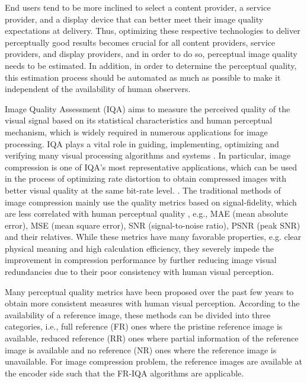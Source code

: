 End users tend to be more inclined to select a content provider, a service provider, and a display device that can better meet their image quality expectations at delivery. Thus, optimizing these respective technologies to deliver perceptually good results becomes crucial for all content providers, service providers, and display providers, and in order to do so, perceptual image quality needs to be estimated. In addition, in order to determine the perceptual quality, this estimation process should be automated as much as possible to make it independent of the availability of human observers. 

Image Quality Assessment (IQA) aims to measure the perceived quality of the visual signal based on its statistical characteristics and human perceptual mechanism, which is widely required in numerous applications for image processing. IQA plays a vital role in guiding, implementing, optimizing and verifying many visual processing algorithms and systems \cite{Lin2011,Wang2018,Wang2018a,Zhang2016}. 
In particular, image compression is one of IQA's most representative applications, which can be used in the process of optimizing rate distortion to obtain compressed images with better visual quality at the same bit-rate level.  \cite{Channappayya2008,Chen2010,Wang2012,Zhang2017,Zhang2017a,Ma2016}. 
The traditional methods of image compression mainly use the quality metrics based on signal-fidelity, which are less correlated with human perceptual quality , e.g., MAE (mean absolute error), MSE
(mean square error), SNR (signal-to-noise ratio), PSNR (peak
SNR) and their relatives. 
While these metrics have many favorable properties, e.g. clear physical meaning and high calculation efficiency, they severely impede the improvement in compression performance by further reducing image visual redundancies due to their poor consistency with human visual perception. 

Many perceptual quality metrics have been proposed over the past few years to obtain more consistent measures with human visual perception. 
According to the availability of a reference image, these methods can be divided into three categories, i.e., full reference (FR) ones where the pristine
reference image is available, reduced reference (RR) ones
where partial information of the reference image is available
and no reference (NR) ones where the reference image is
unavailable. 
For image compression problem, the reference images are available at the encoder side such that the FR-IQA
algorithms are applicable.

